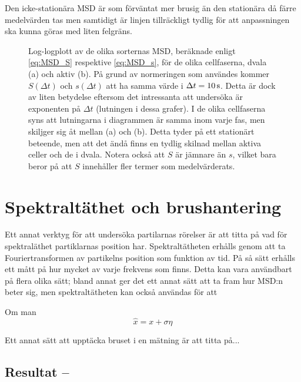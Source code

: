 Den icke-stationära MSD är som förväntat mer brusig än den stationära då färre medelvärden tas men samtidigt är linjen tillräckligt tydlig för att anpassningen ska kunna göras med liten felgräns.

\begin{figure}\centerline{
\subfigure[][]{
\resizebox{0.5\textwidth}{!}{}
}
\subfigure[][]{
\resizebox{0.5\textwidth}{!}{}
}}
\caption{Log-logplott av de olika sorternas MSD, beräknade enligt \eqref{eq:MSD_S} respektive \eqref{eq:MSD_s}, för de olika cellfaserna, dvala (a) och aktiv (b). På grund av normeringen som användes kommer $S(\Delta{t})$ och  $s(\Delta{t})$ att ha samma värde i $\Delta{t}=\unit[10]{s}$. Detta är dock av liten betydelse eftersom det intressanta att undersöka är exponenten på $\Delta{t}$ (lutningen i dessa grafer). I de olika cellfaserna syns att lutningarna i diagrammen är samma inom varje fas, men skiljger sig åt mellan (a) och (b). Detta tyder på ett stationärt beteende, men att det ändå finns en tydlig skilnad mellan aktiva celler och de i dvala. Notera också att $S$ är jämnare än $s$, vilket bara beror på att $S$ innehåller fler termer som medelvärderats. }
\label{fig:MSD}
\end{figure}


\section{Spektraltäthet och brushantering}
Ett annat verktyg för att undersöka partilarnas rörelser är att titta på vad för spektraläthet partiklarnas position har. Spektraltätheten erhålls genom att ta Fouriertransformen av partikelns position som funktion av tid. På så sätt erhålls ett mått på hur mycket av varje frekvens som finns. Detta kan vara användbart på flera olika sätt; bland annat ger det ett annat sätt att ta fram hur MSD:n beter sig, men spektraltätheten kan också användas för att 

Om man 
\begin{equation}
\hat{x} = x + \sigma\eta
\end{equation}



Ett annat sätt att upptäcka bruset i en mätning är att titta på...


\subsection{Resultat -- }


